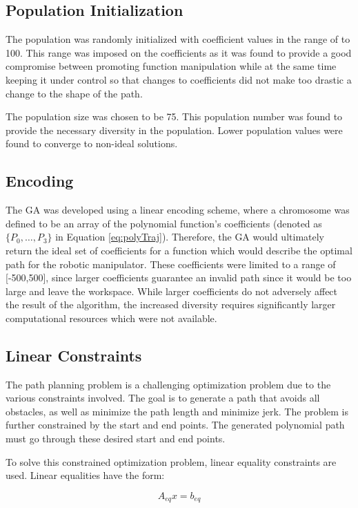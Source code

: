 \subsection{Population Initialization}
The population was randomly initialized with coefficient values in the range of  to 100. This range was imposed on the coefficients as it was found to provide a good compromise between promoting function manipulation while at the same time keeping it under control so that changes to coefficients did not make too drastic a change to the shape of the path.

The population size was chosen to be 75. This population number was found to provide the necessary diversity in the population. Lower population values were found to converge to non-ideal solutions.

\subsection{Encoding}
The GA was developed using a linear encoding scheme, where a chromosome was defined to be an array of the polynomial function's coefficients (denoted as $\{P_0, \ldots, P_3\}$ in Equation \ref{eq:polyTraj}). Therefore, the GA would ultimately return the ideal set of coefficients for a function which would describe the optimal path for the robotic manipulator. These coefficients were limited to a range of [-500,500], since larger coefficients guarantee an invalid path since it would be too large and leave the workspace. While larger coefficients do not adversely affect the result of the algorithm, the increased diversity requires significantly larger computational resources which were not available.

\subsection{Linear Constraints}
The path planning problem is a challenging optimization problem due to the various constraints involved. The goal is to generate a path that avoids all obstacles, as well as minimize the path length and minimize jerk. The problem is further constrained by the start and end points. The generated polynomial path must go through these desired start and end points.

To solve this constrained optimization problem, linear equality constraints are used. Linear equalities have the form:

\begin{equation}
A_{eq}x = b_{eq}
\end{equation}

